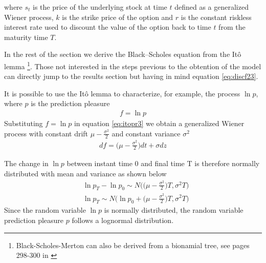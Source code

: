 \documentclass[11pt, onecolumn]{article}
\begin{document}
where $s_t$ is the price of the underlying stock at time $t$ defined as a generalized Wiener process, $k$ is the strike price of the option and $r$ is the constant riskless interest rate used to discount the value of the option back to time $t$ from the maturity time $T$.


In the rest of the section we derive the Black–Scholes equation from the It\^{o} lemma \citep{ito_stochastic_1951} \footnote{Black-Scholes-Merton can  also be derived from a bionamial tree, see pages 298-300 in \citep{hull_options_2011}}. Those not interested in the steps previous to the obtention of the model can directly jump to  the results section but having in mind equation \ref{eq:discf23}.

It is possible to use the  It\^{o} lemma to characterize, for example, the process $\ln p$, where $p$ is the prediction pleasure
\begin{equation*}
\begin{split}
  f = \ln p
\end{split}
\label{eq:slns}
\end{equation*} 
Substituting $f = \ln p$ in equation \ref{eq:itopr3} we obtain a generalized Wiener process with constant drift $\mu - \frac{\sigma^2}{2}$ and constant variance $\sigma^2$ 
\begin{equation*}
\begin{split}
df =  \bigg( \mu - \frac{\sigma^2}{2} \bigg)dt + \sigma dz
\end{split}
\label{eq:slns2}
\end{equation*} 

The change in $\ln p $ between instant time 0 and final time T is therefore normally distributed with mean and variance as shown below
\begin{equation*}
\begin{split}
 & \ln p_T - \ln p_0 \sim N \bigg( \big(\mu - \frac{\sigma ^2}{2} \big) T, \sigma^2 T \bigg) \\
 & \ln p_T  \sim N \bigg( \ln p_0 + \big(\mu - \frac{\sigma ^2}{2} \big) T, \sigma^2 T \bigg) 
\end{split}
\label{eq:slns3}
\end{equation*}
Since the random variable $\ln p$ is normally distributed, the random variable  prediction pleasure $p$ follows a lognormal distribution. 
%
%
\end{document}
